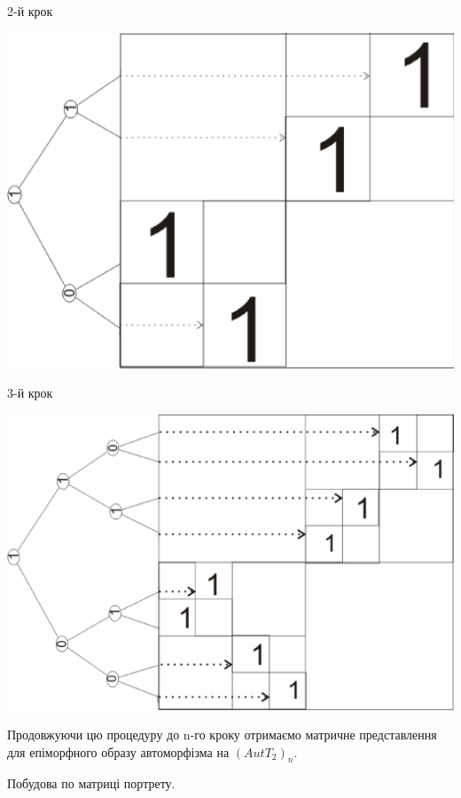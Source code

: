 \documentclass[a4paper,12pt]{article} \usepackage{a4wide}
\numberwithin{equation}{subsection}
\begin{document}
2-й крок
\begin{center}
\includegraphics[scale=0.6]{Autfm3.eps}
\end{center}
3-й крок
\begin{center}
\includegraphics[scale=0.5]{Autfm2.eps}
\end{center}
Продовжуючи цю процедуру до n-го кроку отримаємо матричне представлення для епіморфного образу автоморфізма на $(AutT_2)_n$.

Побудова по матриці портрету.
\end{document}
